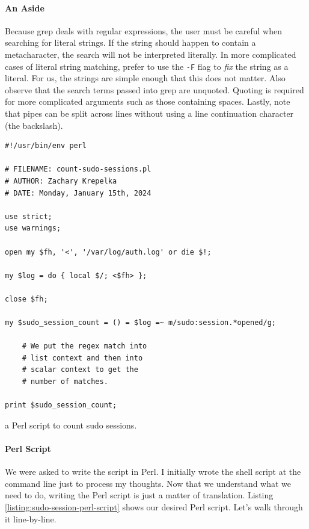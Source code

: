 \documentclass{article}
\begin{document}
\paragraph{An Aside}

Because grep deals with regular expressions, the user must be careful when
searching for literal strings. If the string should happen to contain a
metacharacter, the search will not be interpreted literally. In more complicated
cases of literal string matching, prefer to use the \verb|-F| flag to \emph{fix}
the string as a literal. For us, the strings are simple enough that this does
not matter. Also observe that the search terms passed into grep are unquoted.
Quoting is required for more complicated arguments such as those containing
spaces. Lastly, note that pipes can be split across lines without using a line
continuation character (the backslash).

\begin{listing}[h]
\begin{verbatim}
#!/usr/bin/env perl

# FILENAME: count-sudo-sessions.pl
# AUTHOR: Zachary Krepelka
# DATE: Monday, January 15th, 2024

use strict;
use warnings;

open my $fh, '<', '/var/log/auth.log' or die $!;

my $log = do { local $/; <$fh> };

close $fh;

my $sudo_session_count = () = $log =~ m/sudo:session.*opened/g;

	# We put the regex match into
	# list context and then into
	# scalar context to get the
	# number of matches.

print $sudo_session_count;
\end{verbatim}
\caption{a Perl script to count sudo sessions.}
\label{listing:sudo-session-perl-script}
\end{listing}

\paragraph{Perl Script}

We were asked to write the script in Perl. I initially wrote the shell script at
the command line just to process my thoughts. Now that we understand what we
need to do, writing the Perl script is just a matter of translation.  Listing
\ref{listing:sudo-session-perl-script} shows our desired Perl script.  Let's
walk through it line-by-line.
\end{document}
